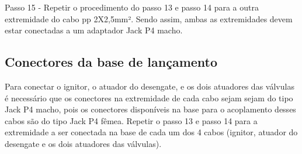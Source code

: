 Passo 15 - Repetir o procedimento do passo 13 e passo 14 para a outra extremidade do cabo pp 2X2,5mm². Sendo assim, ambas as extremidades devem estar conectadas a um adaptador Jack P4 macho.

\subsection*{Conectores da base de lançamento}

Para conectar o ignitor, o atuador do desengate, e os dois atuadores das válvulas é necessário que os conectores na extremidade de cada cabo sejam sejam do tipo Jack P4 macho, pois os conectores disponíveis na base para o acoplamento desses cabos são do tipo Jack P4 fêmea. Repetir o passo 13 e passo 14 para a extremidade a ser conectada na base de cada um dos 4 cabos (ignitor, atuador do desengate e os dois atuadores das válvulas).
